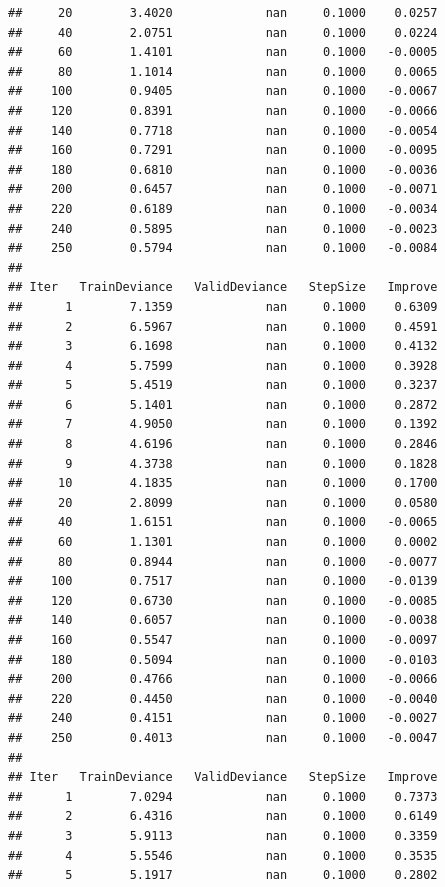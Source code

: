 \documentclass[]{book}
\begin{document}
\begin{verbatim}
##     20        3.4020             nan     0.1000    0.0257
##     40        2.0751             nan     0.1000    0.0224
##     60        1.4101             nan     0.1000   -0.0005
##     80        1.1014             nan     0.1000    0.0065
##    100        0.9405             nan     0.1000   -0.0067
##    120        0.8391             nan     0.1000   -0.0066
##    140        0.7718             nan     0.1000   -0.0054
##    160        0.7291             nan     0.1000   -0.0095
##    180        0.6810             nan     0.1000   -0.0036
##    200        0.6457             nan     0.1000   -0.0071
##    220        0.6189             nan     0.1000   -0.0034
##    240        0.5895             nan     0.1000   -0.0023
##    250        0.5794             nan     0.1000   -0.0084
## 
## Iter   TrainDeviance   ValidDeviance   StepSize   Improve
##      1        7.1359             nan     0.1000    0.6309
##      2        6.5967             nan     0.1000    0.4591
##      3        6.1698             nan     0.1000    0.4132
##      4        5.7599             nan     0.1000    0.3928
##      5        5.4519             nan     0.1000    0.3237
##      6        5.1401             nan     0.1000    0.2872
##      7        4.9050             nan     0.1000    0.1392
##      8        4.6196             nan     0.1000    0.2846
##      9        4.3738             nan     0.1000    0.1828
##     10        4.1835             nan     0.1000    0.1700
##     20        2.8099             nan     0.1000    0.0580
##     40        1.6151             nan     0.1000   -0.0065
##     60        1.1301             nan     0.1000    0.0002
##     80        0.8944             nan     0.1000   -0.0077
##    100        0.7517             nan     0.1000   -0.0139
##    120        0.6730             nan     0.1000   -0.0085
##    140        0.6057             nan     0.1000   -0.0038
##    160        0.5547             nan     0.1000   -0.0097
##    180        0.5094             nan     0.1000   -0.0103
##    200        0.4766             nan     0.1000   -0.0066
##    220        0.4450             nan     0.1000   -0.0040
##    240        0.4151             nan     0.1000   -0.0027
##    250        0.4013             nan     0.1000   -0.0047
## 
## Iter   TrainDeviance   ValidDeviance   StepSize   Improve
##      1        7.0294             nan     0.1000    0.7373
##      2        6.4316             nan     0.1000    0.6149
##      3        5.9113             nan     0.1000    0.3359
##      4        5.5546             nan     0.1000    0.3535
##      5        5.1917             nan     0.1000    0.2802

\end{verbatim}
\end{document}
